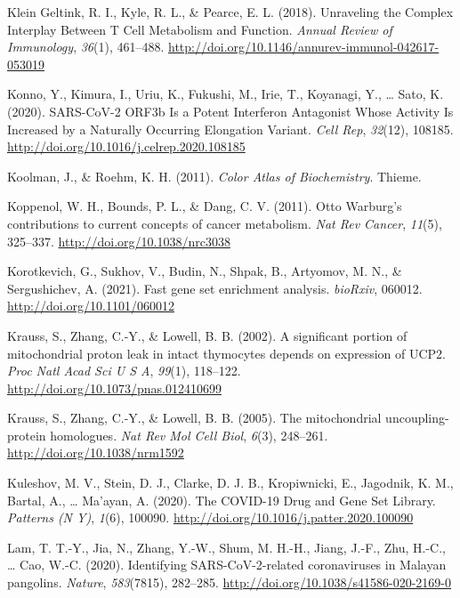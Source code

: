 \documentclass[12pt,twoside,openany,\mydriver]{thesis}  %
\begin{document}
\leavevmode\hypertarget{ref-klein_geltink_unraveling_2018}{}%
Klein Geltink, R. I., Kyle, R. L., \& Pearce, E. L. (2018). Unraveling the Complex Interplay Between T Cell Metabolism and Function. \emph{Annual Review of Immunology}, \emph{36}(1), 461--488. \url{http://doi.org/10.1146/annurev-immunol-042617-053019}

\leavevmode\hypertarget{ref-konno_sars-cov-2_2020}{}%
Konno, Y., Kimura, I., Uriu, K., Fukushi, M., Irie, T., Koyanagi, Y., \ldots{} Sato, K. (2020). SARS-CoV-2 ORF3b Is a Potent Interferon Antagonist Whose Activity Is Increased by a Naturally Occurring Elongation Variant. \emph{Cell Rep}, \emph{32}(12), 108185. \url{http://doi.org/10.1016/j.celrep.2020.108185}

\leavevmode\hypertarget{ref-koolman_color_2011}{}%
Koolman, J., \& Roehm, K. H. (2011). \emph{Color Atlas of Biochemistry}. Thieme.

\leavevmode\hypertarget{ref-koppenol_otto_2011}{}%
Koppenol, W. H., Bounds, P. L., \& Dang, C. V. (2011). Otto Warburg's contributions to current concepts of cancer metabolism. \emph{Nat Rev Cancer}, \emph{11}(5), 325--337. \url{http://doi.org/10.1038/nrc3038}

\leavevmode\hypertarget{ref-korotkevich_fast_2021}{}%
Korotkevich, G., Sukhov, V., Budin, N., Shpak, B., Artyomov, M. N., \& Sergushichev, A. (2021). Fast gene set enrichment analysis. \emph{bioRxiv}, 060012. \url{http://doi.org/10.1101/060012}

\leavevmode\hypertarget{ref-krauss_significant_2002}{}%
Krauss, S., Zhang, C.-Y., \& Lowell, B. B. (2002). A significant portion of mitochondrial proton leak in intact thymocytes depends on expression of UCP2. \emph{Proc Natl Acad Sci U S A}, \emph{99}(1), 118--122. \url{http://doi.org/10.1073/pnas.012410699}

\leavevmode\hypertarget{ref-krauss_mitochondrial_2005}{}%
Krauss, S., Zhang, C.-Y., \& Lowell, B. B. (2005). The mitochondrial uncoupling-protein homologues. \emph{Nat Rev Mol Cell Biol}, \emph{6}(3), 248--261. \url{http://doi.org/10.1038/nrm1592}

\leavevmode\hypertarget{ref-kuleshov_covid-19_2020}{}%
Kuleshov, M. V., Stein, D. J., Clarke, D. J. B., Kropiwnicki, E., Jagodnik, K. M., Bartal, A., \ldots{} Ma'ayan, A. (2020). The COVID-19 Drug and Gene Set Library. \emph{Patterns (N Y)}, \emph{1}(6), 100090. \url{http://doi.org/10.1016/j.patter.2020.100090}

\leavevmode\hypertarget{ref-lam_identifying_2020}{}%
Lam, T. T.-Y., Jia, N., Zhang, Y.-W., Shum, M. H.-H., Jiang, J.-F., Zhu, H.-C., \ldots{} Cao, W.-C. (2020). Identifying SARS-CoV-2-related coronaviruses in Malayan pangolins. \emph{Nature}, \emph{583}(7815), 282--285. \url{http://doi.org/10.1038/s41586-020-2169-0}
\end{document}
